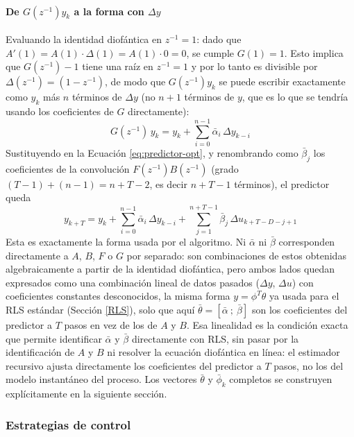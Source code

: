 \paragraph{De $G(z^{-1})y_k$ a la forma con $\Delta y$}
Evaluando la identidad diofántica en $z^{-1}=1$: dado que $A'(1) = A(1)\cdot\Delta(1) = A(1)\cdot 0 = 0$, se cumple $G(1) = 1$. Esto implica que $G(z^{-1})-1$ tiene una raíz en $z^{-1}=1$ y por lo tanto es divisible por $\Delta(z^{-1})=(1-z^{-1})$, de modo que $G(z^{-1})y_k$ se puede escribir exactamente como $y_k$ más $n$ términos de $\Delta y$ (no $n+1$ términos de $y$, que es lo que se tendría usando los coeficientes de $G$ directamente):
\begin{equation}
  G(z^{-1})\,y_k = y_k + \sum_{i=0}^{n-1} \bar{\alpha}_i\,\Delta y_{k-i}
  \label{eq:Gfactor}
\end{equation}
Sustituyendo en la Ecuación \ref{eq:predictor-opt}, y renombrando como $\bar{\beta}_j$ los coeficientes de la convolución $F(z^{-1})B(z^{-1})$ (grado $(T-1)+(n-1)=n+T-2$, es decir $n+T-1$ términos), el predictor queda
\begin{equation}
  y_{k+T} = y_k + \sum_{i=0}^{n-1} \bar{\alpha}_i\,\Delta y_{k-i} + \sum_{j=1}^{n+T-1} \bar{\beta}_j\,\Delta u_{k+T-D-j+1}
  \label{eq:predictor-final}
\end{equation}
Esta es exactamente la forma usada por el algoritmo. Ni $\bar\alpha$ ni $\bar\beta$ corresponden directamente a $A$, $B$, $F$ o $G$ por separado: son combinaciones de estos obtenidas algebraicamente a partir de la identidad diofántica, pero ambos lados quedan expresados como una combinación lineal de datos pasados ($\Delta y$, $\Delta u$) con coeficientes constantes desconocidos, la misma forma $y=\phi^T\theta$ ya usada para el RLS estándar (Sección \ref{RLS}), solo que aquí $\bar\theta = [\bar\alpha\ ;\ \bar\beta]$ son los coeficientes del predictor a $T$ pasos en vez de los de $A$ y $B$. Esa linealidad es la condición exacta que permite identificar $\bar\alpha$ y $\bar\beta$ directamente con RLS, sin pasar por la identificación de $A$ y $B$ ni resolver la ecuación diofántica en línea: el estimador recursivo ajusta directamente los coeficientes del predictor a $T$ pasos, no los del modelo instantáneo del proceso. Los vectores $\bar\theta$ y $\bar\phi_k$ completos se construyen explícitamente en la siguiente sección.

\subsubsection{Estrategias de control}

